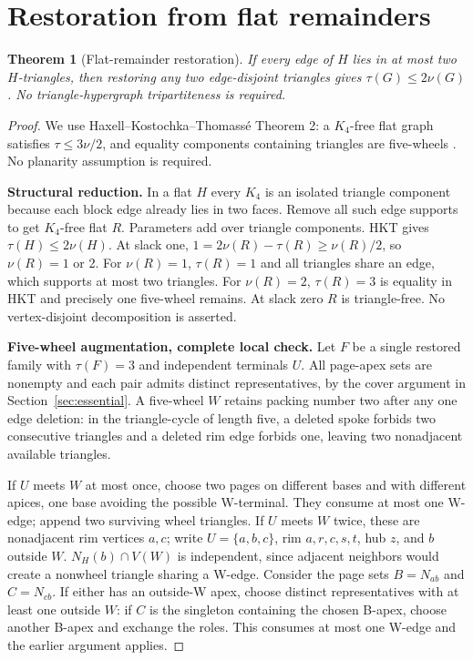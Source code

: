 \documentclass[11pt]{article}
\newtheorem{theorem}{Theorem}[section]
\theoremstyle{definition}\newtheorem{definition}[theorem]{Definition}
\theoremstyle{remark}\newtheorem{remark}[theorem]{Remark}
\begin{document}
\section{Restoration from flat remainders}\label{sec:flat}
\begin{theorem}[Flat-remainder restoration]\label{thm:flat}
If every edge of \(H\) lies in at most two \(H\)-triangles, then restoring any two edge-disjoint triangles gives \(\tau(G)\le 2\nu(G)\). No triangle-hypergraph tripartiteness is required.
\end{theorem}
\begin{proof}\leavevmode
We use Haxell--Kostochka--Thomassé Theorem 2: a \(K_4\)-free flat graph satisfies \(\tau\le3\nu/2\), and equality components containing triangles are five-wheels \cite{HKTFlat}. No planarity assumption is required.

\textbf{Structural reduction.} In a flat \(H\) every \(K_4\) is an isolated triangle component because each block edge already lies in two faces. Remove all such edge supports to get \(K_4\)-free flat \(R\). Parameters add over triangle components. HKT gives \(\tau(H)\le 2\nu(H)\). At slack one, \(1=2\nu(R)-\tau(R)\ge \nu(R)/2\), so \(\nu(R)=1\) or 2. For \(\nu(R)=1\), \(\tau(R)=1\) and all triangles share an edge, which supports at most two triangles. For \(\nu(R)=2\), \(\tau(R)=3\) is equality in HKT and precisely one five-wheel remains. At slack zero \(R\) is triangle-free. No vertex-disjoint decomposition is asserted.

\textbf{Five-wheel augmentation, complete local check.} Let \(F\) be a single restored family with \(\tau(F)=3\) and independent terminals \(U\). All page-apex sets are nonempty and each pair admits distinct representatives, by the cover argument in Section~\ref{sec:essential}. A five-wheel \(W\) retains packing number two after any one edge deletion: in the triangle-cycle of length five, a deleted spoke forbids two consecutive triangles and a deleted rim edge forbids one, leaving two nonadjacent available triangles.

If \(U\) meets \(W\) at most once, choose two pages on different bases and with different apices, one base avoiding the possible W-terminal. They consume at most one W-edge; append two surviving wheel triangles. If \(U\) meets \(W\) twice, these are nonadjacent rim vertices \(a,c\); write \(U=\{a,b,c\}\), rim \(a,r,c,s,t\), hub \(z\), and \(b\) outside \(W\). \(N_H(b) \cap V(W)\) is independent, since adjacent neighbors would create a nonwheel triangle sharing a W-edge. Consider the page sets \(B=N_{ab}\) and \(C=N_{cb}\). If either has an outside-W apex, choose distinct representatives with at least one outside \(W\): if \(C\) is the singleton containing the chosen B-apex, choose another B-apex and exchange the roles. This consumes at most one W-edge and the earlier argument applies.


\end{proof}
\end{document}
